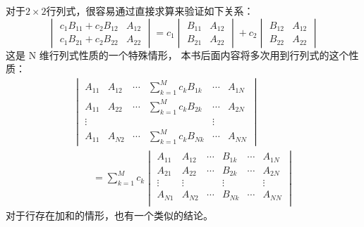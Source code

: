 对于$2\times 2$行列式，很容易通过直接求算来验证如下关系：
\[
\begin{vmatrix}
 c_1B_{11} + c_2B_{12} & A_{12} \\ c_1B_{21} + c_2B_{22} & A_{22}
\end{vmatrix} = 
c_1 \begin{vmatrix}
 B_{11} & A_{12} \\ B_{21} & A_{22}
\end{vmatrix} + 
c_2 \begin{vmatrix}
 B_{12} & A_{12} \\ B_{22} & A_{22}
\end{vmatrix}
\]
这是 N 维行列式性质的一个特殊情形，
本书后面内容将多次用到行列式的这个性质：
\begin{equation}
 \begin{split}
 \begin{vmatrix}
     A_{11} & A_{12} &\cdots &\displaystyle\sum_{k=1}^M c_kB_{1k} &\cdots &A_{1N} \\ 
     A_{11} & A_{22} &\cdots &\displaystyle\sum_{k=1}^M c_kB_{2k} &\cdots &A_{2N} \\ 
     \vdots &\                &\           &\                                                       &\vdots \\
     A_{11} & A_{N2} &\cdots &\displaystyle\sum_{k=1}^M c_kB_{Nk} &\cdots &A_{NN}
 \end{vmatrix}\qquad \\
 \qquad = \sum_{k=1}^{M} c_k \begin{vmatrix}
     A_{11} & A_{12} &\cdots      &B_{1k}     & \cdots      & A_{1N} \\
     A_{21} & A_{22} &\cdots      &B_{2k}     & \cdots     & A_{2N} \\
     \vdots &\vdots     &\               &\vdots      &\          &\vdots \\
     A_{N1} & A_{N2} &\cdots      &B_{Nk}     & \cdots      & A_{NN} \\
 \end{vmatrix}
 \end{split}
 \label{eq:1.40}
\end{equation}
对于行存在加和的情形，也有一个类似的结论。

